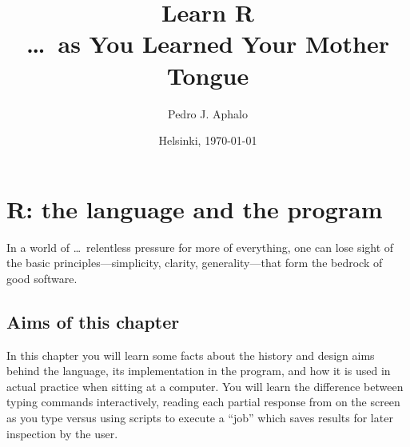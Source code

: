 \documentclass[krantz2]{krantz}\usepackage{knitr}
\begin{document}
\title{\Huge{\sffamily Learn R\\{\Large\ldots\ as You Learned Your Mother Tongue}}}

\author{Pedro J. Aphalo}

\date{Helsinki, \today}


















\frontmatter

\maketitle

\newpage

\setcounter{page}{7} %
\tableofcontents
%


\mainmatter






\chapter{R: the language and the program}\label{chap:R:introduction}

\begin{VF}
In a world of \ldots\ relentless pressure for more of everything, one can lose sight of the basic principles---simplicity, clarity, generality---that form the bedrock of good software.

\nocite{Kernighan1999}
\end{VF}


\section{Aims of this chapter}

In this chapter you will learn some facts about the history and design aims behind the \Rlang language, its implementation in the \Rpgrm program, and how it is used in actual practice when sitting at a computer. You will learn the difference between typing commands interactively, reading each partial response from \Rlang on the screen as you type versus using \Rlang scripts to execute a ``job'' which saves results for later inspection by the user.
\end{document}
